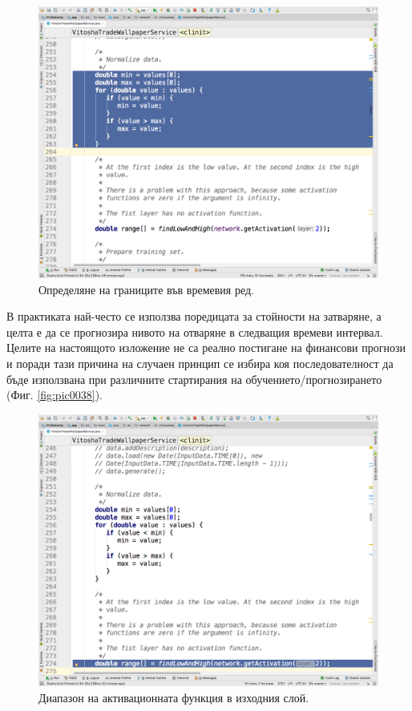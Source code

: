 \documentclass[book,14pt,oneside,openany]{memoir}
\begin{document}
\begin{figure}[h]
  \centering
  \includegraphics[height=0.45\pdfpageheight]{pic0039}
  \caption{Определяне на границите във времевия ред.}
\label{fig:pic0039}
\end{figure}
\FloatBarrier

В практиката най-често се използва поредицата за стойности на затваряне, а целта е да се прогнозира нивото на отваряне в следващия времеви интервал. Целите на настоящото изложение не са реално постигане на финансови прогнози и поради тази причина на случаен принцип се избира коя последователност да бъде използвана при различните стартирания на обучението/прогнозирането (Фиг. \ref{fig:pic0038}).

\begin{figure}[h]
  \centering
  \includegraphics[height=0.45\pdfpageheight]{pic0040}
  \caption{Диапазон на активационната функция в изходния слой.}
\label{fig:pic0040}
\end{figure}
\FloatBarrier
\end{document}
